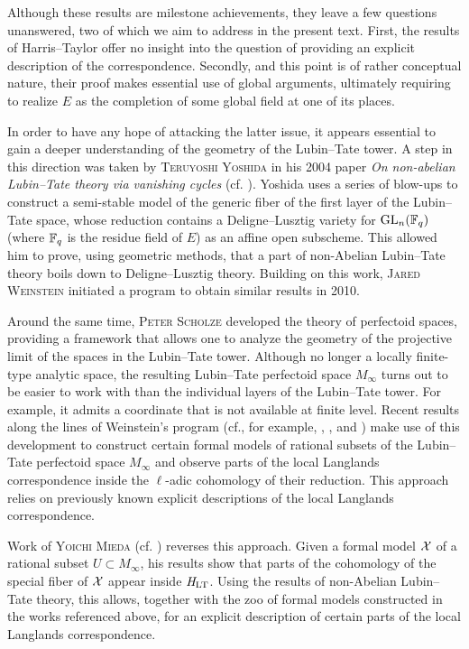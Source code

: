 \documentclass[../main.tex]{subfiles}
\begin{document}
Although these results are milestone achievements, they leave a few questions
unanswered, two of which we aim to address in the present text. 
First, the results of Harris--Taylor offer no insight into the question of
providing an explicit description of the correspondence.
Secondly, and this point is of rather conceptual nature, their proof makes
essential use of global arguments, ultimately requiring to realize $E$ as the
completion of some global field at one of its places.

In order to have any hope of attacking the latter issue, it appears essential
to gain a deeper understanding of the geometry of the Lubin--Tate tower. 
A step in this direction was taken by \textsc{Teruyoshi Yoshida} in his
2004 paper \textit{On non-abelian Lubin--Tate theory via vanishing cycles}
(cf. \cite{yoshida2010non}).
Yoshida uses a series of blow-ups to construct a
semi-stable model of the generic fiber of the first layer of the Lubin--Tate space,
whose reduction contains a Deligne--Lusztig variety for $\operatorname{GL}_n(\mathbb{F}_q)$ (where
$\mathbb{F}_q$ is the residue field of $E$) as an affine open subscheme. This allowed
him to prove, using geometric methods, that a part of non-Abelian Lubin--Tate theory
boils down to Deligne--Lusztig theory. 
Building on this work, \textsc{Jared Weinstein} initiated a program
to obtain similar results in 2010. 

Around the same time, \textsc{Peter Scholze} developed the theory of perfectoid spaces,
providing a framework that allows one to analyze the geometry of the projective limit
of the spaces in the Lubin--Tate tower. 
Although no longer a locally finite-type analytic space, the resulting
Lubin--Tate perfectoid space $M_\infty$ turns out to be easier to work with than
the individual layers of the Lubin--Tate tower. For example, it admits a
coordinate that is not available at finite level.
Recent results along the lines of Weinstein's program
(cf., for example, \cite{weinstein2016semistable},
\cite{BoyarchenkoWeinstein2011MaxVar}, \cite{imaitsushima2020affinoids} and
\cite{tokimoto2020affinoids}) make use of this development to construct
certain formal models of rational subsets of the Lubin--Tate perfectoid space
$M_{\infty}$ and observe parts of the local Langlands correspondence
inside the $\ell$-adic cohomology of their reduction. This approach relies on
previously known explicit descriptions of the local Langlands
correspondence.

Work of \textsc{Yoichi Mieda} (cf. \cite{mieda2016geometric}) reverses this
approach. Given a formal model $\mathcal{X}$ of a rational subset $U \subset M_\infty$,
his results show that parts of the cohomology of the
special fiber of $\mathcal{X}$ appear inside $\mathit H_{\mathrm{LT}}$. Using the results of non-Abelian
Lubin--Tate theory, this allows, together with the zoo of formal models
constructed in the works referenced above, for an explicit description of
certain parts of the local Langlands correspondence.
\end{document}
